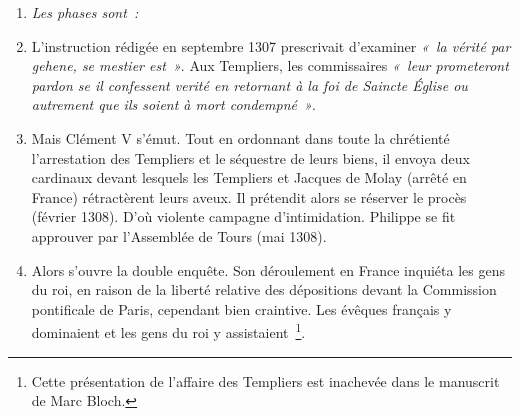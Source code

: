 \documentclass[french,twoside]{book} %
\newlength{\listmod}
\newcommand{\listhead}[1]{\hspace{-1\listmod}\emph{#1}}
\begin{document}
\begin{enumerate}[itemsep=\baselineskip,]
\item[]\listhead{Les phases sont :}
\item  
{}

 L’instruction rédigée en septembre 1307 prescrivait d’examiner \emph{« la vérité par gehene, se mestier est »}. Aux Templiers, les commissaires \emph{« leur prometeront pardon se il confessent verité en retornant à la foi de Saincte Église ou autrement que ils soient à mort condempné »}.
 
\item  Mais Clément V s’émut. Tout en ordonnant dans toute la chrétienté l’arrestation des Templiers et le séquestre de leurs biens, il envoya deux cardinaux devant lesquels les Templiers et Jacques de Molay (arrêté en France) rétractèrent leurs aveux. Il prétendit alors se réserver le procès (février 1308). D’où violente campagne d’intimidation. Philippe se fit approuver par l’Assemblée de Tours (mai 1308).\par
 

 
\item  Alors s’ouvre la double enquête. Son déroulement en France inquiéta les gens du roi, en raison de la liberté relative des dépositions devant la Commission pontificale de Paris, cependant bien craintive. Les évêques français y dominaient et les gens du roi y assistaient \footnote{Cette présentation de l’affaire des Templiers est inachevée dans le manuscrit de Marc Bloch.}.
 
\end{enumerate}
\end{document}
